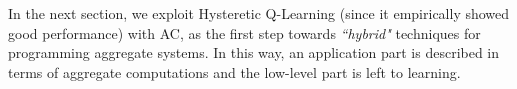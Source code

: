 \documentclass[conference]{IEEEtran}
\begin{document}
In the next section, we exploit Hysteretic Q-Learning (since it empirically showed good performance) with AC, as the first step towards \textit{``hybrid"} techniques for programming aggregate systems.
 In this way, an application part is described in terms of aggregate computations and the low-level part is left to learning.





\end{document}
